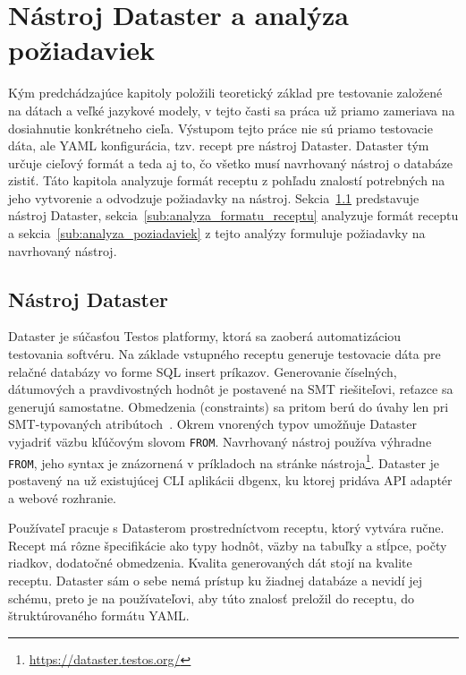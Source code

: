 \chapter{Nástroj Dataster a analýza požiadaviek}
\label{ch:kap4}

Kým predchádzajúce kapitoly položili teoretický základ pre testovanie založené na dátach a veľké jazykové modely, v tejto časti sa práca už priamo zameriava na dosiahnutie konkrétneho cieľa. Výstupom tejto práce nie sú priamo testovacie dáta, ale YAML konfigurácia, tzv. recept pre nástroj Dataster. Dataster  tým určuje cieľový formát a teda aj to, čo všetko musí navrhovaný nástroj o databáze zistiť. Táto kapitola analyzuje formát receptu z pohľadu znalostí potrebných na jeho vytvorenie a odvodzuje požiadavky na nástroj. Sekcia~\ref{sub:nastroj_dataster} predstavuje nástroj Dataster, sekcia~\ref{sub:analyza_formatu_receptu}  analyzuje formát receptu a sekcia~\ref{sub:analyza_poziadaviek} z tejto analýzy formuluje požiadavky na navrhovaný nástroj.

\section{Nástroj Dataster}
\label{sub:nastroj_dataster}

Dataster je súčasťou Testos platformy, ktorá sa zaoberá automatizáciou testovania softvéru. Na základe vstupného receptu generuje testovacie dáta pre relačné databázy vo forme SQL insert príkazov. Generovanie číselných, dátumových a pravdivostných hodnôt je postavené na SMT riešiteľovi, reťazce sa generujú samostatne. Obmedzenia (constraints) sa pritom berú do úvahy len pri SMT-typovaných atribútoch~\cite{Vlach2020}. Okrem vnorených typov umožňuje Dataster vyjadriť väzbu kľúčovým slovom \texttt{FROM}. Navrhovaný nástroj používa výhradne \texttt{FROM}, jeho syntax je znázornená v príkladoch na stránke nástroja\footnote{\url{https://dataster.testos.org/}}. Dataster je postavený na už existujúcej CLI aplikácii dbgenx, ku ktorej pridáva API adaptér a webové rozhranie. 

Používateľ pracuje s Datasterom prostredníctvom receptu, ktorý vytvára ručne. Recept má rôzne špecifikácie ako typy hodnôt, väzby na tabuľky a stĺpce, počty riadkov, dodatočné obmedzenia. Kvalita generovaných dát stojí na kvalite receptu. Dataster sám o sebe nemá prístup ku žiadnej databáze a nevidí jej schému, preto je na používateľovi, aby túto znalosť preložil do receptu, do štruktúrovaného formátu YAML. 

